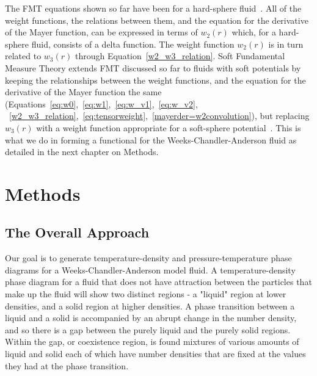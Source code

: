 \documentclass[double,12pt]{beavtex}
\begin{document}
The FMT equations shown so far have been for a hard-sphere fluid~\cite{Hansen}.
All of the weight functions, the relations between them, and the equation 
for the derivative of the Mayer function, can be expressed in terms of 
$w_{2}(r)$ which, for a hard-sphere fluid, consists of a delta function.
The weight function $w_{2}(r)$ is in turn related to $w_{3}(r)$ through 
Equation~\ref{w2_w3_relation}.
Soft Fundamental Measure Theory extends FMT discussed so far to fluids 
with soft potentials by keeping the relationships between the weight 
functions, and the equation for the derivative of the Mayer function 
the same (Equations~\ref{eq:w0},~\ref{eq:w1},~\ref{eq:w_v1},~\ref{eq:w_v2},
~\ref{w2_w3_relation},~\ref{eq:tensorweight},~\ref{mayerder=w2convolution}), 
but replacing $w_{3}(r)$ with a weight function appropriate 
for a soft-sphere potential~\cite{schmidt1999density, schmidt2000fluid}. 
This is what we do in forming a functional for the Weeks-Chandler-Anderson 
fluid as detailed in the next chapter on Methods.

\chapter{Methods}

\section{The Overall Approach}
  
Our goal is to generate temperature-density and pressure-temperature 
phase diagrams for a Weeks-Chandler-Anderson model fluid. 
A temperature-density phase diagram for a fluid that does not
have attraction between the particles that make up the fluid will show
two distinct regions - a "liquid" region at lower densities, and a solid 
region at higher densities. 
A phase transition between a liquid and a solid is accompanied by an 
abrupt change in the number density, and so there is a gap between the 
purely liquid and the purely solid regions. Within the gap, or coexistence
region, is found mixtures of various amounts of liquid and solid each of
which have number densities that are fixed at the values they had at the 
phase transition. 
\end{document}
